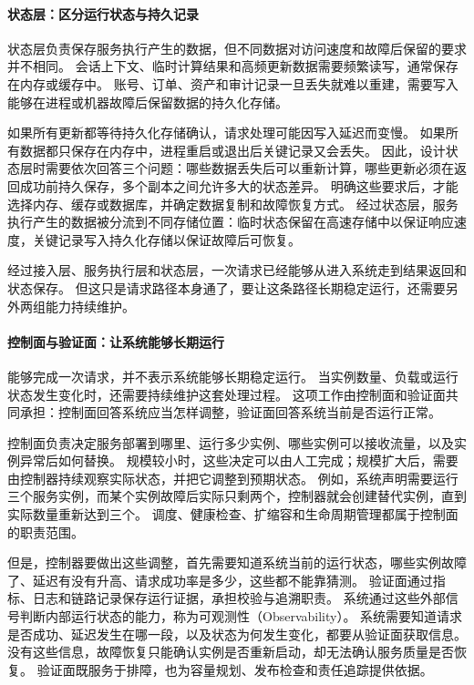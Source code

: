 \paragraph{状态层：区分运行状态与持久记录}

状态层负责保存服务执行产生的数据，但不同数据对访问速度和故障后保留的要求并不相同。
会话上下文、临时计算结果和高频更新数据需要频繁读写，通常保存在内存或缓存中。
账号、订单、资产和审计记录一旦丢失就难以重建，需要写入能够在进程或机器故障后保留数据的持久化存储。

如果所有更新都等待持久化存储确认，请求处理可能因写入延迟而变慢。
如果所有数据都只保存在内存中，进程重启或退出后关键记录又会丢失。
因此，设计状态层时需要依次回答三个问题：哪些数据丢失后可以重新计算，哪些更新必须在返回成功前持久保存，多个副本之间允许多大的状态差异。
明确这些要求后，才能选择内存、缓存或数据库，并确定数据复制和故障恢复方式。
经过状态层，服务执行产生的数据被分流到不同存储位置：临时状态保留在高速存储中以保证响应速度，关键记录写入持久化存储以保证故障后可恢复。

经过接入层、服务执行层和状态层，一次请求已经能够从进入系统走到结果返回和状态保存。
但这只是请求路径本身通了，要让这条路径长期稳定运行，还需要另外两组能力持续维护。

\paragraph{控制面与验证面：让系统能够长期运行}

能够完成一次请求，并不表示系统能够长期稳定运行。
当实例数量、负载或运行状态发生变化时，还需要持续维护这套处理过程。
这项工作由控制面和验证面共同承担：控制面回答系统应当怎样调整，验证面回答系统当前是否运行正常。

控制面负责决定服务部署到哪里、运行多少实例、哪些实例可以接收流量，以及实例异常后如何替换。
规模较小时，这些决定可以由人工完成；规模扩大后，需要由控制器持续观察实际状态，并把它调整到预期状态。
例如，系统声明需要运行三个服务实例，而某个实例故障后实际只剩两个，控制器就会创建替代实例，直到实际数量重新达到三个。
调度、健康检查、扩缩容和生命周期管理都属于控制面的职责范围。

但是，控制器要做出这些调整，首先需要知道系统当前的运行状态，哪些实例故障了、延迟有没有升高、请求成功率是多少，这些都不能靠猜测。
验证面通过指标、日志和链路记录保存运行证据，承担校验与追溯职责。
系统通过这些外部信号判断内部运行状态的能力，称为可观测性（Observability）。
系统需要知道请求是否成功、延迟发生在哪一段，以及状态为何发生变化，都要从验证面获取信息。
没有这些信息，故障恢复只能确认实例是否重新启动，却无法确认服务质量是否恢复。
验证面既服务于排障，也为容量规划、发布检查和责任追踪提供依据。

